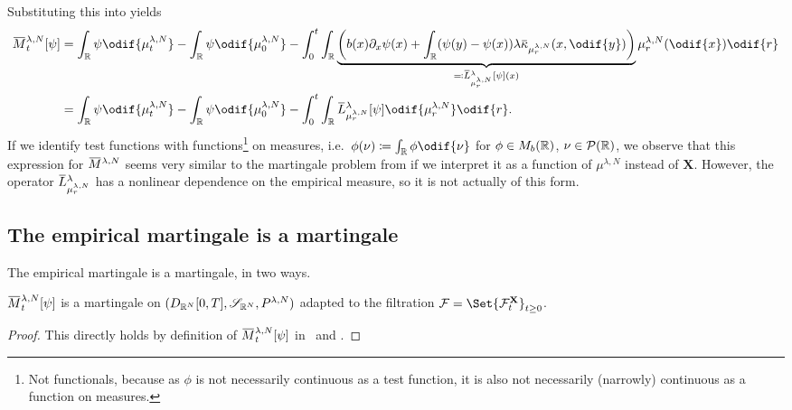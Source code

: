 Substituting this into  yields
\begin{equation}\label{eq:emp-M-expression}
  \begin{split}
    \ol{M}_t^{\lambda, N}[\psi]
     & = \int_\potspace \psi \odif{\mu_t^{\lambda, N}} - \int_\potspace \psi \odif{\mu_0^{\lambda, N}}
    - \int_0^t \int_\potspace \underbrace{\br*{ b(x) \partial_x \psi(x) + \int_\potspace (\psi(y) - \psi(x)) \lambda \ol{\kappa}_{\mu_{r}^{\lambda, N}}(x, \odif{y}) }}_{\eqqcolon \ol{L}_{\mu_{r}^{\lambda, N}}^{\lambda} [\psi](x)} \mu_{r}^{\lambda, N}(\odif{x}) \odif{r} \\
     & = \int_\potspace \psi \odif{\mu_t^{\lambda, N}} - \int_\potspace \psi \odif{\mu_0^{\lambda, N}}
    - \int_0^t \int_\potspace \ol{L}_{\mu_{r}^{\lambda, N}}^{\lambda} [\psi] \odif{\mu_{r}^{\lambda, N}} \odif{r}.
  \end{split}
\end{equation}
If we identify test functions with functions\footnote{Not functionals, because as \( \phi \) is not necessarily continuous as a test function, it is also not necessarily (narrowly) continuous as a function on measures.} on measures, i.e.\ \( \phi(\nu) \coloneqq \int_\potspace \phi \odif{\nu} \) for \(\phi \in M_b(\mathbb{R})\), \( \nu \in \mathcal{P}(\mathbb{R}) \), we observe that this expression for \(\ol{M}^{\lambda,N}\) seems very similar to the martingale problem from  if we interpret it as a function of \(\mu^{\lambda,N}\) instead of \(\bm{X}\).
However, the operator \(\ol{L}_{\mu_{r}^{\lambda, N}}^{\lambda}\) has a nonlinear dependence on the empirical measure, so it is not actually of this form.

\subsection{The empirical martingale is a martingale}

The empirical martingale is a martingale, in two ways.
\begin{corollary}\label{cor:easy-emp-M-mart}
  \(\ol{M}_t^{\lambda,N}[\psi]\) is a martingale on \((D_{\mathbb{R}^N}[0,T], \mathscr{S}_{\mathbb{R}^N}, P^{\lambda, N})\) adapted to the filtration \( \cF = \Set{\cF_t^\bm{X}}_{t\geq0} \).
\end{corollary}
\begin{proof}
  This directly holds by definition of \( \ol{M}_t^{\lambda,N}[\psi] \) in~ and .
\end{proof}

